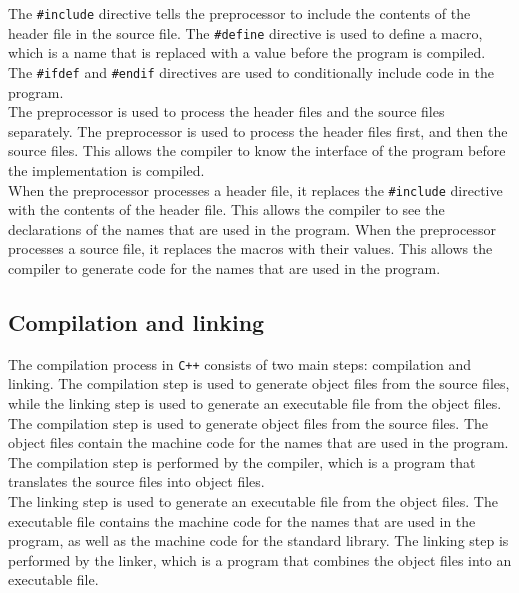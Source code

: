 The \texttt{\#include} directive tells the preprocessor to include the contents of the header file in the source file. The
\texttt{\#define} directive is used to define a macro, which is a name that is replaced with a value before the program is
compiled. The \texttt{\#ifdef} and \texttt{\#endif} directives are used to conditionally include code in the program.\\

The preprocessor is used to process the header files and the source files separately. The preprocessor is used to process
the header files first, and then the source files. This allows the compiler to know the interface of the program before
the implementation is compiled.\\

When the preprocessor processes a header file, it replaces the \texttt{\#include} directive with the contents of the header
file. This allows the compiler to see the declarations of the names that are used in the program. When the preprocessor processes
a source file, it replaces the macros with their values. This allows the compiler to generate code for the names that are used
in the program.\\

\subsection{Compilation and linking}

The compilation process in \texttt{C++} consists of two main steps: compilation and linking. The compilation step is used to
generate object files from the source files, while the linking step is used to generate an executable file from the object files.\\

The compilation step is used to generate object files from the source files. The object files contain the machine code for the
names that are used in the program. The compilation step is performed by the compiler, which is a program that translates the
source files into object files.\\

The linking step is used to generate an executable file from the object files. The executable file contains the machine code
for the names that are used in the program, as well as the machine code for the standard library. The linking step is performed
by the linker, which is a program that combines the object files into an executable file.\\

